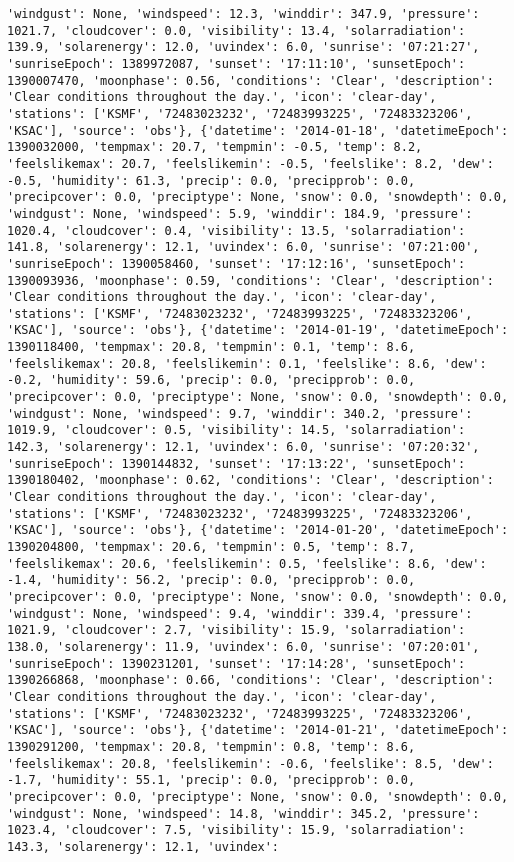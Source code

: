 \documentclass[
  letterpaper,
  DIV=11,
  numbers=noendperiod]{scrartcl}
\begin{document}
\begin{verbatim}
'windgust': None, 'windspeed': 12.3, 'winddir': 347.9, 'pressure': 1021.7, 'cloudcover': 0.0, 'visibility': 13.4, 'solarradiation': 139.9, 'solarenergy': 12.0, 'uvindex': 6.0, 'sunrise': '07:21:27', 'sunriseEpoch': 1389972087, 'sunset': '17:11:10', 'sunsetEpoch': 1390007470, 'moonphase': 0.56, 'conditions': 'Clear', 'description': 'Clear conditions throughout the day.', 'icon': 'clear-day', 'stations': ['KSMF', '72483023232', '72483993225', '72483323206', 'KSAC'], 'source': 'obs'}, {'datetime': '2014-01-18', 'datetimeEpoch': 1390032000, 'tempmax': 20.7, 'tempmin': -0.5, 'temp': 8.2, 'feelslikemax': 20.7, 'feelslikemin': -0.5, 'feelslike': 8.2, 'dew': -0.5, 'humidity': 61.3, 'precip': 0.0, 'precipprob': 0.0, 'precipcover': 0.0, 'preciptype': None, 'snow': 0.0, 'snowdepth': 0.0, 'windgust': None, 'windspeed': 5.9, 'winddir': 184.9, 'pressure': 1020.4, 'cloudcover': 0.4, 'visibility': 13.5, 'solarradiation': 141.8, 'solarenergy': 12.1, 'uvindex': 6.0, 'sunrise': '07:21:00', 'sunriseEpoch': 1390058460, 'sunset': '17:12:16', 'sunsetEpoch': 1390093936, 'moonphase': 0.59, 'conditions': 'Clear', 'description': 'Clear conditions throughout the day.', 'icon': 'clear-day', 'stations': ['KSMF', '72483023232', '72483993225', '72483323206', 'KSAC'], 'source': 'obs'}, {'datetime': '2014-01-19', 'datetimeEpoch': 1390118400, 'tempmax': 20.8, 'tempmin': 0.1, 'temp': 8.6, 'feelslikemax': 20.8, 'feelslikemin': 0.1, 'feelslike': 8.6, 'dew': -0.2, 'humidity': 59.6, 'precip': 0.0, 'precipprob': 0.0, 'precipcover': 0.0, 'preciptype': None, 'snow': 0.0, 'snowdepth': 0.0, 'windgust': None, 'windspeed': 9.7, 'winddir': 340.2, 'pressure': 1019.9, 'cloudcover': 0.5, 'visibility': 14.5, 'solarradiation': 142.3, 'solarenergy': 12.1, 'uvindex': 6.0, 'sunrise': '07:20:32', 'sunriseEpoch': 1390144832, 'sunset': '17:13:22', 'sunsetEpoch': 1390180402, 'moonphase': 0.62, 'conditions': 'Clear', 'description': 'Clear conditions throughout the day.', 'icon': 'clear-day', 'stations': ['KSMF', '72483023232', '72483993225', '72483323206', 'KSAC'], 'source': 'obs'}, {'datetime': '2014-01-20', 'datetimeEpoch': 1390204800, 'tempmax': 20.6, 'tempmin': 0.5, 'temp': 8.7, 'feelslikemax': 20.6, 'feelslikemin': 0.5, 'feelslike': 8.6, 'dew': -1.4, 'humidity': 56.2, 'precip': 0.0, 'precipprob': 0.0, 'precipcover': 0.0, 'preciptype': None, 'snow': 0.0, 'snowdepth': 0.0, 'windgust': None, 'windspeed': 9.4, 'winddir': 339.4, 'pressure': 1021.9, 'cloudcover': 2.7, 'visibility': 15.9, 'solarradiation': 138.0, 'solarenergy': 11.9, 'uvindex': 6.0, 'sunrise': '07:20:01', 'sunriseEpoch': 1390231201, 'sunset': '17:14:28', 'sunsetEpoch': 1390266868, 'moonphase': 0.66, 'conditions': 'Clear', 'description': 'Clear conditions throughout the day.', 'icon': 'clear-day', 'stations': ['KSMF', '72483023232', '72483993225', '72483323206', 'KSAC'], 'source': 'obs'}, {'datetime': '2014-01-21', 'datetimeEpoch': 1390291200, 'tempmax': 20.8, 'tempmin': 0.8, 'temp': 8.6, 'feelslikemax': 20.8, 'feelslikemin': -0.6, 'feelslike': 8.5, 'dew': -1.7, 'humidity': 55.1, 'precip': 0.0, 'precipprob': 0.0, 'precipcover': 0.0, 'preciptype': None, 'snow': 0.0, 'snowdepth': 0.0, 'windgust': None, 'windspeed': 14.8, 'winddir': 345.2, 'pressure': 1023.4, 'cloudcover': 7.5, 'visibility': 15.9, 'solarradiation': 143.3, 'solarenergy': 12.1, 'uvindex': 
\end{verbatim}
\end{document}
